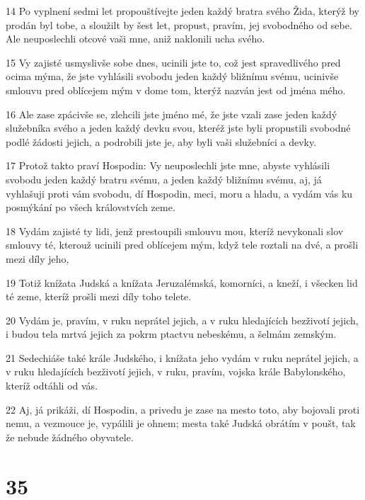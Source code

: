 \par 14 Po vyplnení sedmi let propouštívejte jeden každý bratra svého Žida, kterýž by prodán byl tobe, a sloužilt by šest let, propust, pravím, jej svobodného od sebe. Ale neuposlechli otcové vaši mne, aniž naklonili ucha svého.
\par 15 Vy zajisté usmyslivše sobe dnes, ucinili jste to, což jest spravedlivého pred ocima mýma, že jste vyhlásili svobodu jeden každý bližnímu svému, ucinivše smlouvu pred oblícejem mým v dome tom, kterýž nazván jest od jména mého.
\par 16 Ale zase zpácivše se, zlehcili jste jméno mé, že jste vzali zase jeden každý služebníka svého a jeden každý devku svou, kteréž jste byli propustili svobodné podlé žádosti jejich, a podrobili jste je, aby byli vaši služebníci a devky.
\par 17 Protož takto praví Hospodin: Vy neuposlechli jste mne, abyste vyhlásili svobodu jeden každý bratru svému, a jeden každý bližnímu svému, aj, já vyhlašuji proti vám svobodu, dí Hospodin, meci, moru a hladu, a vydám vás ku posmýkání po všech královstvích zeme.
\par 18 Vydám zajisté ty lidi, jenž prestoupili smlouvu mou, kteríž nevykonali slov smlouvy té, kterouž ucinili pred oblícejem mým, když tele roztali na dvé, a prošli mezi díly jeho,
\par 19 Totiž knížata Judská a knížata Jeruzalémská, komorníci, a kneží, i všecken lid té zeme, kteríž prošli mezi díly toho telete.
\par 20 Vydám je, pravím, v ruku neprátel jejich, a v ruku hledajících bezživotí jejich, i budou tela mrtvá jejich za pokrm ptactvu nebeskému, a šelmám zemským.
\par 21 Sedechiáše také krále Judského, i knížata jeho vydám v ruku neprátel jejich, a v ruku hledajících bezživotí jejich, v ruku, pravím, vojska krále Babylonského, kteríž odtáhli od vás.
\par 22 Aj, já prikáži, dí Hospodin, a privedu je zase na mesto toto, aby bojovali proti nemu, a vezmouce je, vypálili je ohnem; mesta také Judská obrátím v poušt, tak že nebude žádného obyvatele.

\chapter{35}

